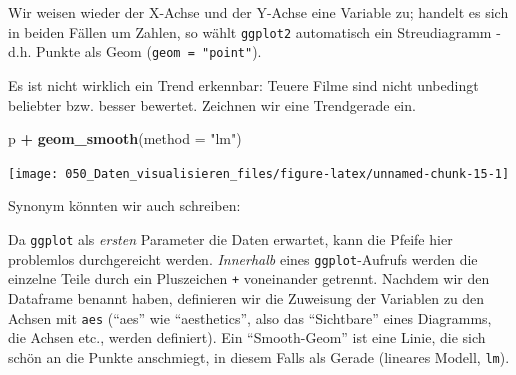 \documentclass[12pt,ngerman,]{book}
\makeatletter
\newenvironment{Shaded}{\begin{snugshade}}{\end{snugshade}}
\newcommand{\KeywordTok}[1]{\textcolor[rgb]{0.13,0.29,0.53}{\textbf{#1}}}
\newcommand{\DataTypeTok}[1]{\textcolor[rgb]{0.13,0.29,0.53}{#1}}
\newcommand{\DecValTok}[1]{\textcolor[rgb]{0.00,0.00,0.81}{#1}}
\newcommand{\StringTok}[1]{\textcolor[rgb]{0.31,0.60,0.02}{#1}}
\newcommand{\OperatorTok}[1]{\textcolor[rgb]{0.81,0.36,0.00}{\textbf{#1}}}
\newcommand{\NormalTok}[1]{#1}
\newenvironment{kframe}{%
\medskip{}
\setlength{\fboxsep}{.8em}
 \def\at@end@of@kframe{}%
 \ifinner\ifhmode%
  \def\at@end@of@kframe{\end{minipage}}%
  \begin{minipage}{\columnwidth}%
 \fi\fi%
 \def\FrameCommand##1{\hskip\@totalleftmargin \hskip-\fboxsep
 \colorbox{shadecolor}{##1}\hskip-\fboxsep
     \hskip-\linewidth \hskip-\@totalleftmargin \hskip\columnwidth}%
 \MakeFramed {\advance\hsize-\width
   \@totalleftmargin\z@ \linewidth\hsize
   \@setminipage}}%
 {\par\unskip\endMakeFramed%
 \at@end@of@kframe}
\renewenvironment{Shaded}{\begin{kframe}}{\end{kframe}}
\theoremstyle{definition}
\theoremstyle{definition}
\theoremstyle{remark}
\makeatother
\begin{document}
Wir weisen wieder der X-Achse und der Y-Achse eine Variable zu; handelt
es sich in beiden Fällen um Zahlen, so wählt \texttt{ggplot2}
automatisch ein Streudiagramm - d.h. Punkte als Geom
(\texttt{geom\ =\ "point"}).

Es ist nicht wirklich ein Trend erkennbar: Teuere Filme sind nicht
unbedingt beliebter bzw. besser bewertet. Zeichnen wir eine Trendgerade
ein.

\begin{Shaded}
\begin{Highlighting}[]
\NormalTok{p }\OperatorTok{+}\StringTok{ }\KeywordTok{geom_smooth}\NormalTok{(}\DataTypeTok{method =} \StringTok{"lm"}\NormalTok{)}
\end{Highlighting}
\end{Shaded}

\begin{center}\texttt{[image: 050\_Daten\_visualisieren\_files/figure-latex/unnamed-chunk-15-1]} \end{center}

Synonym könnten wir auch schreiben:

\begin{Shaded}
\end{Shaded}

Da \texttt{ggplot} als \emph{ersten} Parameter die Daten erwartet, kann
die Pfeife hier problemlos durchgereicht werden. \emph{Innerhalb} eines
\texttt{ggplot}-Aufrufs werden die einzelne Teile durch ein Pluszeichen
\texttt{+} voneinander getrennt. Nachdem wir den Dataframe benannt
haben, definieren wir die Zuweisung der Variablen zu den Achsen mit
\texttt{aes} (``aes'' wie ``aesthetics'', also das ``Sichtbare'' eines
Diagramms, die Achsen etc., werden definiert). Ein ``Smooth-Geom'' ist
eine Linie, die sich schön an die Punkte anschmiegt, in diesem Falls als
Gerade (lineares Modell, \texttt{lm}).
\end{document}
